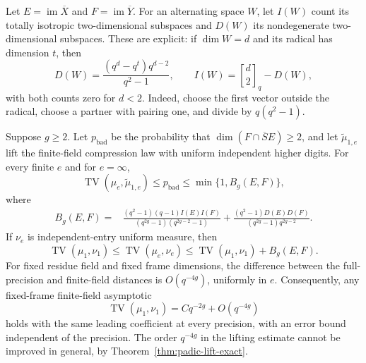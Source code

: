 Let $E=\operatorname{im}\overline X$ and $F=\operatorname{im}\overline Y$.
For an alternating space $W$, let $I(W)$ count its totally isotropic
two-dimensional subspaces and $D(W)$ its nondegenerate two-dimensional
subspaces. These are explicit: if $\dim W=d$ and its radical has
dimension $t$, then
\begin{equation}\label{eq:padic-plane-counts}
 D(W)=\frac{(q^d-q^t)q^{d-2}}{q^2-1},\qquad
 I(W)=\genfrac{[}{]}{0pt}{}{d}{2}_q-D(W),
\end{equation}
with both counts zero for $d<2$. Indeed, choose the first vector
outside the radical, choose a partner with pairing one, and divide
by $q(q^2-1)$.

\begin{theorem}
\label{thm:padic-general-TV}
Suppose $g\geq2$. Let $p_{\mathrm{bad}}$ be the probability that
$\dim(F\cap\overline S E)\geq2$, and let
$\widetilde\mu_{1,e}$ lift the finite-field compression law with
uniform independent higher digits. For every finite $e$ and for
$e=\infty$,
\begin{equation}\label{eq:padic-general-lift}
 \operatorname{TV}(\mu_e,\widetilde\mu_{1,e})\leq p_{\mathrm{bad}}
 \leq \min\{1,B_g(E,F)\},
\end{equation}
where
\begin{align}\label{eq:padic-B}
 B_g(E,F)={}&
 \frac{(q^2-1)(q-1)I(E)I(F)}
 {(q^{2g}-1)(q^{2g-2}-1)}
 +\frac{(q^2-1)D(E)D(F)}
 {(q^{2g}-1)q^{2g-2}}.
\end{align}
If $\nu_e$ is independent-entry uniform measure, then
\begin{equation}\label{eq:padic-TV-sandwich}
 \operatorname{TV}(\mu_1,\nu_1)
 \leq\operatorname{TV}(\mu_e,\nu_e)
 \leq\operatorname{TV}(\mu_1,\nu_1)+B_g(E,F).
\end{equation}
For fixed residue field and fixed frame dimensions, the difference
between the full-precision and finite-field distances is
$O(q^{-4g})$, uniformly in $e$. Consequently, any fixed-frame
finite-field asymptotic
\[
 \operatorname{TV}(\mu_1,\nu_1)=Cq^{-2g}+O(q^{-4g})
\]
holds with the same leading coefficient at every precision, with an
error bound independent of the precision. The order $q^{-4g}$ in
the lifting estimate cannot be improved in general, by
Theorem~\ref{thm:padic-lift-exact}.
\end{theorem}

